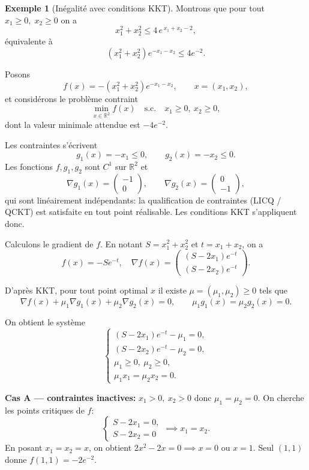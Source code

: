 \documentclass[a4paper,12pt,openany]{book}
\theoremstyle{plain}
\theoremstyle{definition}
\newtheorem{example}[theorem]{Exemple}
\theoremstyle{remark}
\theoremstyle{nbstyle}
\begin{document}
	
	\begin{example}[Inégalité avec conditions KKT]
		Montrons que pour tout \(x_1\ge0,\;x_2\ge0\) on a
		\[
		x_1^2 + x_2^2 \le 4\,e^{\,x_1+x_2-2},
		\]
		équivalente à
		\[
		(x_1^2 + x_2^2)e^{-x_1-x_2} \le 4e^{-2}.
		\]
		
		Posons
		\[
		f(x)= - (x_1^2 + x_2^2)e^{-x_1-x_2},\qquad x=(x_1,x_2),
		\]
		et considérons le problème contraint
		\[
		\displaystyle\min_{x\in\mathbb{R}^2} f(x)\quad\text{s.c.}\quad x_1\ge0,\ x_2\ge0,
		\]
		dont la valeur minimale attendue est \(-4e^{-2}\).
		
		Les contraintes s’écrivent 
		\[
		g_1(x)=-x_1\le0,\qquad g_2(x)=-x_2\le0.
		\]
		Les fonctions \(f,g_1,g_2\) sont \(C^1\) sur \(\mathbb{R}^2\) et
		\[
		\nabla g_1(x)=\begin{pmatrix}-1\\0\end{pmatrix},\qquad
		\nabla g_2(x)=\begin{pmatrix}0\\-1\end{pmatrix},
		\]
		qui sont linéairement indépendants: la qualification de contraintes (LICQ / QCKT) est satisfaite en tout point réalisable. Les conditions KKT s’appliquent donc.
		
		Calculons le gradient de \(f\). En notant \(S=x_1^2+x_2^2\) et \(t=x_1+x_2\), on a
		\[
		f(x) = -S e^{-t},\quad
		\nabla f(x)=
		\begin{pmatrix}
		(S-2x_1)e^{-t}\\[2mm]
		(S-2x_2)e^{-t}
		\end{pmatrix}.
		\]
		
		D’après KKT, pour tout point optimal \(x\) il existe \(\mu=(\mu_1,\mu_2)\ge0\) tels que
		\[
		\nabla f(x)+\mu_1\nabla g_1(x)+\mu_2\nabla g_2(x)=0,
		\qquad
		\mu_1 g_1(x)=\mu_2 g_2(x)=0.
		\]
		
		On obtient le système
		\[
		\begin{cases}
		(S-2x_1)e^{-t}-\mu_1=0,\\[1mm]
		(S-2x_2)e^{-t}-\mu_2=0,\\[1mm]
		\mu_1\ge0,\ \mu_2\ge0,\\[1mm]
		\mu_1 x_1=\mu_2 x_2=0.
		\end{cases}
		\]
		
		\textbf{Cas A — contraintes inactives:} \(x_1>0,\ x_2>0\) donc \(\mu_1=\mu_2=0\). On cherche les points critiques de \(f\):
		\[
		\begin{cases}
		S-2x_1=0,\\
		S-2x_2=0
		\end{cases} \implies x_1=x_2.
		\]
		En posant \(x_1=x_2=x\), on obtient \(2x^2-2x=0 \implies x=0 \text{ ou } x=1\). Seul \((1,1)\) donne \(f(1,1)=-2e^{-2}\).
		

\end{example}
\end{document}
